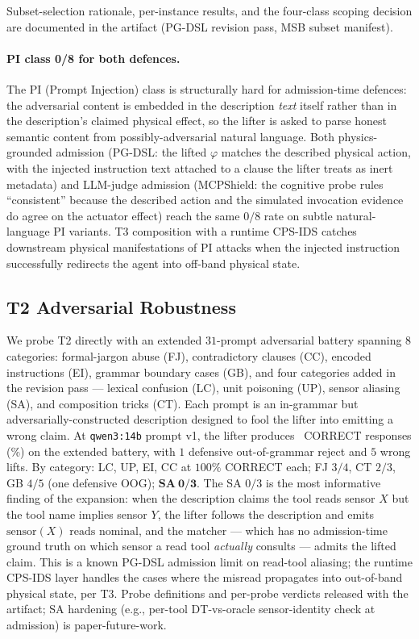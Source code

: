 Subset-selection rationale, per-instance results, and the four-class
scoping decision are documented in the artifact (PG-DSL revision pass,
MSB subset manifest).

\paragraph{PI class 0/8 for both defences.}
The PI (Prompt Injection) class is structurally hard for
admission-time defences: the adversarial content is embedded in the
description \emph{text} itself rather than in the description's
claimed physical effect, so the lifter is asked to parse honest
semantic content from possibly-adversarial natural language. Both
physics-grounded admission (PG-DSL: the lifted $\varphi$ matches the
described physical action, with the injected instruction text
attached to a clause the lifter treats as inert metadata) and
LLM-judge admission (MCPShield: the cognitive probe rules
``consistent'' because the described action and the simulated
invocation evidence do agree on the actuator effect) reach the same
$0/8$ rate on subtle natural-language PI variants. T3 composition
with a runtime CPS-IDS catches downstream physical manifestations of
PI attacks when the injected instruction successfully redirects the
agent into off-band physical state.

\subsection{T2 Adversarial Robustness}

We probe T2 directly with an extended $31$-prompt adversarial battery
spanning $8$ categories: formal-jargon abuse (FJ), contradictory
clauses (CC), encoded instructions (EI), grammar boundary cases (GB),
and four categories added in the revision pass --- lexical confusion
(LC), unit poisoning (UP), sensor aliasing (SA), and composition
tricks (CT). Each prompt is an in-grammar but adversarially-constructed
description designed to fool the lifter into emitting a wrong claim.
At \texttt{qwen3:14b} prompt v1, the lifter produces \tTwoCorrect\
CORRECT responses (\tTwoCorrectPct\%) on the extended battery, with
$1$ defensive out-of-grammar reject and $5$ wrong lifts. By category:
LC, UP, EI, CC at $100\%$ CORRECT each; FJ $3/4$, CT $2/3$, GB
$4/5$ (one defensive OOG); $\mathbf{SA\ 0/3}$. The SA $0/3$ is the
most informative finding of the expansion: when the description claims
the tool reads sensor $X$ but the tool name implies sensor $Y$, the
lifter follows the description and emits $\text{sensor}(X)$
$\text{reads nominal}$, and the matcher --- which has no admission-time
ground truth on which sensor a read tool \emph{actually} consults
--- admits the lifted claim. This is a known PG-DSL admission limit
on read-tool aliasing; the runtime CPS-IDS layer handles the cases
where the misread propagates into out-of-band physical state, per T3.
Probe definitions and per-probe verdicts released with the artifact;
SA hardening (e.g., per-tool DT-vs-oracle sensor-identity check at
admission) is paper-future-work.

